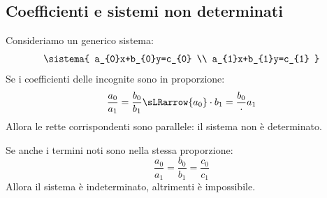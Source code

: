 \subsection{Coefficienti e sistemi non determinati}
 

Consideriamo un generico sistema:
\[\sistema{
 a_{0}x+b_{0}y=c_{0} \\
 a_{1}x+b_{1}y=c_{1} 
}\]
Se i coefficienti delle incognite sono in proporzione:
\[\frac{a_{0}}{a_{1}} = \frac{b_{0}}{b_{1}} \sLRarrow
{a_{0}} \cdot {b_{1}} = \frac{b_{0}} \cdot {a_{1}}\]
Allora le rette corrispondenti sono parallele: il sistema non è determinato.

Se anche i termini noti sono nella stessa proporzione:
\[\frac{a_{0}}{a_{1}} = \frac{b_{0}}{b_{1}} = \frac{c_{0}}{c_{1}}\]
Allora il sistema è indeterminato, altrimenti è impossibile.
% 
% 
% 
% 
% 
% 
% 
% 
% 
% 
